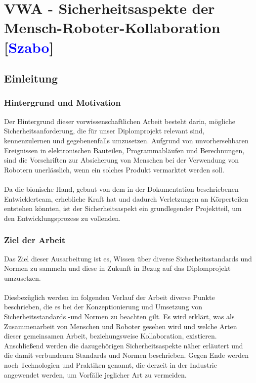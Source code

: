 \documentclass[titlepage,12pt,twoside]{article}
\begin{document}
\newpage

\section{VWA - Sicherheitsaspekte der Mensch-Roboter-Kollaboration [\textcolor{blue}{Szabo}]}
\subsection{Einleitung}
\subsubsection{Hintergrund und Motivation}
Der Hintergrund dieser vorwissenschaftlichen Arbeit besteht darin, mögliche 
Sicherheitsanforderung, die für unser Diplomprojekt relevant sind, kennenzulernen 
und gegebenenfalls umzusetzen. Aufgrund von unvorhersehbaren Ereignissen in 
elektronischen Bauteilen, Programmabläufen und Berechnungen, sind die Vorschriften 
zur Absicherung von Menschen bei der Verwendung von Robotern unerlässlich, wenn 
ein solches Produkt vermarktet werden soll. \\
\\
Da die bionische Hand, gebaut von dem in der Dokumentation beschriebenen 
Entwicklerteam, erhebliche Kraft hat und dadurch Verletzungen an Körperteilen 
entstehen könnten, ist der Sicherheitsaspekt ein grundlegender Projektteil, um 
den Entwicklungsprozess zu vollenden. \\
\subsubsection{Ziel der Arbeit}
Das Ziel dieser Ausarbeitung ist es, Wissen über diverse Sicherheitsstandards und 
Normen zu sammeln und diese in Zukunft in Bezug auf das Diplomprojekt umzusetzen. \\
\\ 
Diesbezüglich werden im folgenden Verlauf der Arbeit diverse Punkte beschrieben, 
die es bei der Konzeptionierung und Umsetzung von Sicherheitsstandards -und Normen 
zu beachten gilt. Es wird erklärt, was als Zusammenarbeit von Menschen und Roboter 
gesehen wird und welche Arten dieser gemeinsamen Arbeit, beziehungsweise 
Kollaboration, existieren. Anschließend werden die dazugehörigen 
Sicherheitsaspekte näher erläutert und die damit verbundenen Standards und Normen 
beschrieben. Gegen Ende werden noch Technologien und Praktiken genannt, die 
derzeit in der Industrie angewendet werden, um Vorfälle jeglicher Art zu vermeiden. \\
\end{document}
